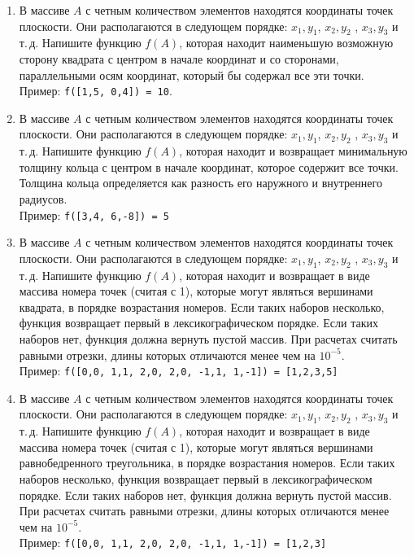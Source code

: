\documentclass{article}
\begin{document}
\begin{enumerate}[label={}, leftmargin=0pt, itemindent=0pt]
\begin{enumerate}[label=\arabic{enumi}.\arabic*.]
\item 
В массиве $A$ с четным количеством элементов находятся координаты точек плоскости. Они располагаются в следующем порядке: $x_1,y_1$, $x_2,y_2$ , $x_3,y_3$ и т.\,д. Напишите функцию $f(A)$, которая находит наименьшую возможную сторону квадрата с центром в начале координат и со сторонами, параллельными осям координат, который бы содержал все эти точки.
\\Пример: \texttt{f([1,5, 0,4]) = 10}.

\item 
В массиве $A$ с четным количеством элементов находятся координаты точек плоскости. Они располагаются в следующем порядке: $x_1,y_1$, $x_2,y_2$ , $x_3,y_3$ и т.\,д. Напишите функцию $f(A)$, которая находит и возвращает минимальную толщину кольца с центром в начале координат, которое содержит все точки. Толщина кольца определяется как разность его наружного и внутреннего радиусов.
\\Пример: \texttt{f([3,4, 6,-8]) = 5}

\item 
В массиве $A$ с четным количеством элементов находятся координаты точек плоскости. Они располагаются в следующем порядке: $x_1,y_1$, $x_2,y_2$ , $x_3,y_3$ и т.\,д. Напишите функцию $f(A)$, которая находит и возвращает в виде массива номера точек (считая с 1), которые могут являться вершинами квадрата, в порядке возрастания номеров. Если таких наборов несколько, функция возвращает первый в лексикографическом порядке. Если таких наборов нет, функция должна вернуть пустой массив. При расчетах считать равными отрезки, длины которых отличаются менее чем на $10^{-5}$.
\\Пример: \texttt{f([0,0, 1,1, 2,0, 2,0, -1,1, 1,-1]) = [1,2,3,5]}

\item 
В массиве $A$ с четным количеством элементов находятся координаты точек плоскости. Они располагаются в следующем порядке: $x_1,y_1$, $x_2,y_2$ , $x_3,y_3$ и т.\,д. Напишите функцию $f(A)$, которая находит и возвращает в виде массива номера точек (считая с 1), которые могут являться вершинами равнобедренного треугольника, в порядке возрастания номеров. Если таких наборов несколько, функция возвращает первый в лексикографическом порядке. Если таких наборов нет, функция должна вернуть пустой массив.  При расчетах считать равными отрезки, длины которых отличаются менее чем на $10^{-5}$.
\\Пример: \texttt{f([0,0, 1,1, 2,0, 2,0, -1,1, 1,-1]) = [1,2,3]}


\end{enumerate}
\end{enumerate}
\end{document}
